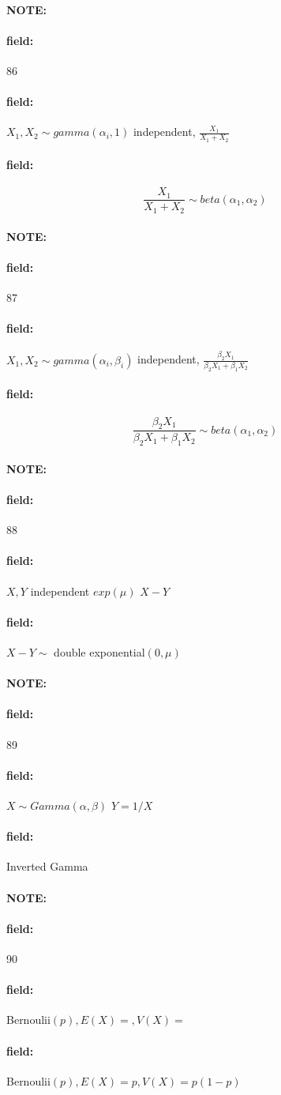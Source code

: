 \documentclass[12pt]{article}
\newenvironment{note}{\paragraph{NOTE:}}{}
\newenvironment{field}{\paragraph{field:}}{}
\begin{document}
\begin{note} \begin{field} \tiny 86 \end{field}
  \begin{field}
    $X_1,X_2 \sim gamma(\alpha_i,1)$ independent, $\frac{X_1}{X_1 + X_2} $
  \end{field}
  \begin{field}
    $$ \frac{X_1}{X_1 + X_2} \sim beta(\alpha_1,\alpha_2)$$
  \end{field}
\end{note}

\begin{note} \begin{field} \tiny 87 \end{field}
  \begin{field}
    $X_1,X_2 \sim gamma(\alpha_i,\beta_i)$ independent, $\frac{\beta_2X_1}{\beta_2X_1 + \beta_1X_2} $
  \end{field}
  \begin{field}
    $$ \frac{\beta_2X_1}{\beta_2X_1 + \beta_1X_2}\sim beta(\alpha_1,\alpha_2)$$
  \end{field}
\end{note}

\begin{note} \begin{field} \tiny 88 \end{field}
  \begin{field}
    $X,Y $ independent $exp(\mu)$ $X-Y$
  \end{field}
  \begin{field}
    $X-Y \sim $ double exponential$(0,\mu)$
  \end{field}
\end{note}


\begin{note} \begin{field} \tiny 89 \end{field}
  \begin{field}

    $X \sim Gamma(\alpha,\beta)$ $Y = 1/X$
  \end{field}
  \begin{field}
      Inverted Gamma
  \end{field}
\end{note}

\begin{note} \begin{field} \tiny 90 \end{field}
  \begin{field}
    Bernoulii$(p), E(X) = , V(X) = $
  \end{field}
  \begin{field}
     Bernoulii$(p), E(X) = p, V(X) = p(1-p)$
  \end{field}
\end{note}
\end{document}
